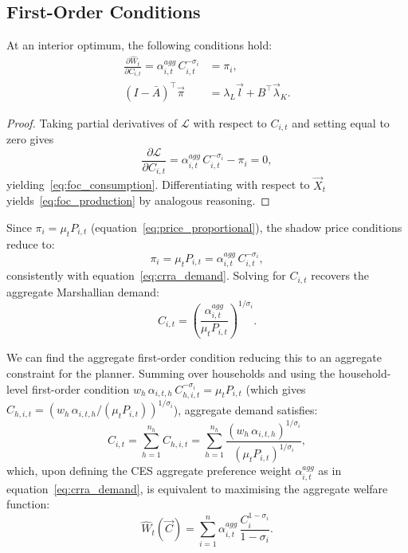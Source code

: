 \subsection{First-Order Conditions}

\begin{theorem}
\label{thm:foc}
At an interior optimum, the following conditions hold:
\begin{align}
    \frac{\partial \hat{W}_t}{\partial C_{i,t}}
    = \alpha^{agg}_{i,t}\,C_{i,t}^{-\sigma_i}
 &= \pi_i,
    \label{eq:foc_consumption}\\[4pt]
    (I - \bar{A})^{\top} \vec{\pi}
        &= \lambda_L \vec{l} + B^{\top} \vec{\lambda}_{K}.
    \label{eq:foc_production}
\end{align}
\end{theorem}

\begin{proof}
Taking partial derivatives of $\mathcal{L}$ with respect to $C_{i,t}$
and setting equal to zero gives
\[
    \frac{\partial \mathcal{L}}{\partial C_{i,t}}
    = \alpha^{agg}_{i,t}\,C_{i,t}^{-\sigma_i} - \pi_i = 0,
\]
yielding~\eqref{eq:foc_consumption}. Differentiating with respect to
$\vec{X}_t$ yields~\eqref{eq:foc_production} by analogous reasoning.
\end{proof}

Since $\pi_i = \mu_t P_{i,t}$ (equation~\eqref{eq:price_proportional}),
the shadow price conditions reduce to:
%
\begin{equation}\label{eq:shadow_prices}
    \pi_i = \mu_t P_{i,t} = \alpha^{agg}_{i,t}\,C_{i,t}^{-\sigma_i},
\end{equation}
%
consistently with equation~\eqref{eq:crra_demand}. Solving for
$C_{i,t}$ recovers the aggregate Marshallian demand:
%
\begin{equation}
    C_{i,t} = \left(\frac{\alpha^{agg}_{i,t}}{\mu_t P_{i,t}}\right)^{1/\sigma_i}.
\end{equation}

We can find the aggregate first-order condition reducing this to an
aggregate constraint for the planner. Summing over households and using
the household-level first-order condition
$w_h\,\alpha_{i,t,h}\,C_{h,i,t}^{-\sigma_i} = \mu_t P_{i,t}$
(which gives $C_{h,i,t} = (w_h\,\alpha_{i,t,h}/(\mu_t P_{i,t}))^{1/\sigma_i}$),
aggregate demand satisfies:
%
\begin{equation}\label{aggregate consumer FOC}
    C_{i,t} = \sum_{h=1}^{n_h} C_{h,i,t}
    = 
      \sum_{h=1}^{n_h} \frac{(w_h\,\alpha_{i,t,h})^{1/\sigma_i}}{(\mu_t P_{i,t})^{1/\sigma_i}},
\end{equation}
%
which, upon defining the CES aggregate preference weight
$\alpha^{agg}_{i,t}$ as in equation~\eqref{eq:crra_demand}, is
equivalent to maximising the aggregate welfare function:
%
\begin{equation}
    \hat{W}_t(\vec{C}) = \sum_{i=1}^n \alpha^{agg}_{i,t}
      \,\frac{C_{i}^{1-\sigma_i}}{1-\sigma_i}.
\end{equation}

